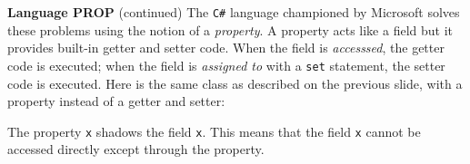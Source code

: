 \begin{minipage}[t]{\sw}
\slidenumber
\LARGE
{\bf Language PROP} (continued)\exx
The \verb'C#' language championed by Microsoft
solves these problems using the notion of a {\em property}.
A property acts like a field
but it provides built-in getter and setter code.
When the field is {\em accesssed}, the getter code is executed;
when the field is {\em assigned to} with a \verb'set' statement,
the setter code is executed.\exx
Here is the same class as described on the previous slide,
with a property instead of a getter and setter:
\Large
{} %
\LARGE
The property \verb'x' shadows the field \verb'x'.
This means that the field \verb'x' cannot be accessed directly
except through the property.\exx
\end{minipage}

